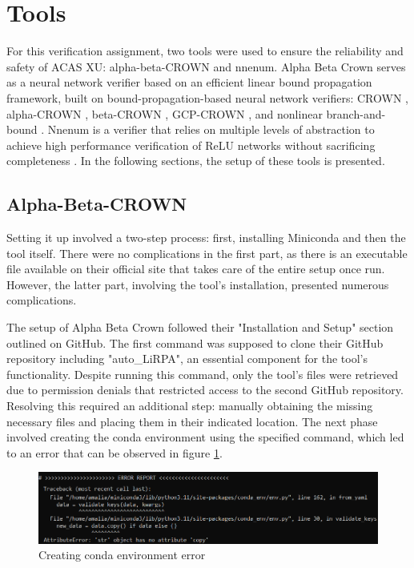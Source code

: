 \section{Tools}
\label{chap:ch3}

For this verification assignment, two tools were used to ensure the reliability and safety of ACAS XU: alpha-beta-CROWN and nnenum. Alpha Beta Crown serves as a neural network verifier based on an efficient linear bound propagation framework, built on  bound-propagation-based neural network verifiers: CROWN \cite{xu2020automatic, zhang2018efficient}, alpha-CROWN \cite{xu2021fast}, beta-CROWN \cite{wang2021beta}, GCP-CROWN \cite{zhang2022general}, and nonlinear branch-and-bound \cite{shi2023generalnonlinear}. Nnenum is a verifier that relies on multiple levels of abstraction to achieve high performance  verification of ReLU networks without sacrificing completeness \cite{10.1007/978-3-030-76384-8_2}. In the following sections, the setup of these tools is presented.

\subsection{Alpha-Beta-CROWN}

Setting it up involved a two-step process: first, installing Miniconda and then the tool itself. There were no complications in the first part, as there is an executable file available on their official site that takes care of the entire setup once run. However, the latter part, involving the tool's installation, presented numerous complications.

The setup of Alpha Beta Crown followed their "Installation and Setup" section outlined on GitHub. The first command was supposed to clone their GitHub repository including "auto\_LiRPA"\cite{xu2020automatic}, an essential component for the tool's functionality. Despite running this command, only the tool's files were retrieved due to permission denials that restricted access to the second GitHub repository. Resolving this required an additional step: manually obtaining the missing necessary files and placing them in their indicated location. The next phase involved creating the conda environment using the specified command, which led to an error that can be observed in figure \ref{Fig_Err}. 

\begin{figure}[htbp]
	\centering
		\includegraphics[width=14cm]{./Figures/ToolErr.png}
	\caption{Creating conda environment error}
	\label{Fig_Err}
\end{figure}


